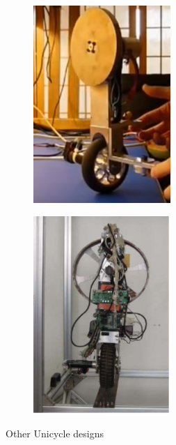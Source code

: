 \documentclass[twoside,twocolumn,12pt]{article}
\begin{document}
\begin{figure}[t!]
  \centering
  \begin{subfigure}[t]{0.325\textwidth}
    \includegraphics[width=\linewidth,height=7.5cm]{other1}
   \caption{\cite{other1}}
  \label{sub:oother1}
  \end{subfigure}
  \begin{subfigure}[t]{0.325\textwidth}
    \includegraphics[width=\linewidth,height=7.5cm]{other3}
    \caption{\cite{other2}}
  \label{sub:other2}
  \end{subfigure}
  \caption{Other Unicycle designs}
  \label{fig:otheruni}
\end{figure}

\end{document}
